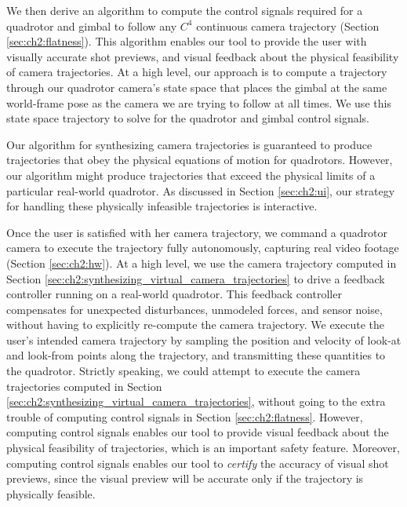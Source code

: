 We then derive an algorithm to compute the control signals required for a quadrotor and gimbal to follow any $C^4$ continuous camera trajectory (Section \ref{sec:ch2:flatness}).
This algorithm enables our tool to provide the user with visually accurate shot previews, and visual feedback about the physical feasibility of camera trajectories.
At a high level, our approach is to compute a trajectory through our quadrotor camera's state space that places the gimbal at the same world-frame pose as the camera we are trying to follow at all times.
We use this state space trajectory to solve for the quadrotor and gimbal control signals.

Our algorithm for synthesizing camera trajectories is guaranteed to produce trajectories that obey the physical equations of motion for quadrotors.
However, our algorithm might produce trajectories that exceed the physical limits of a particular real-world quadrotor.
As discussed in Section \ref{sec:ch2:ui}, our strategy for handling these physically infeasible trajectories is interactive.

Once the user is satisfied with her camera trajectory, we command a quadrotor camera to execute the trajectory fully autonomously, capturing real video footage (Section \ref{sec:ch2:hw}).
At a high level, we use the camera trajectory computed in Section \ref{sec:ch2:synthesizing_virtual_camera_trajectories} to drive a feedback controller running on a real-world quadrotor.
This feedback controller compensates for unexpected disturbances, unmodeled forces, and sensor noise, without having to explicitly re-compute the camera trajectory.
We execute the user's intended camera trajectory by sampling the position and velocity of look-at and look-from points along the trajectory, and transmitting these quantities to the quadrotor.
Strictly speaking, we could attempt to execute the camera trajectories computed in Section \ref{sec:ch2:synthesizing_virtual_camera_trajectories}, without going to the extra trouble of  computing control signals  in Section \ref{sec:ch2:flatness}.
However, computing control signals enables our tool to provide visual feedback about the physical feasibility of trajectories, which is an important safety feature. Moreover, computing control signals enables our tool to \emph{certify} the accuracy of visual shot previews, since the visual preview will be accurate only if the trajectory is physically feasible.

